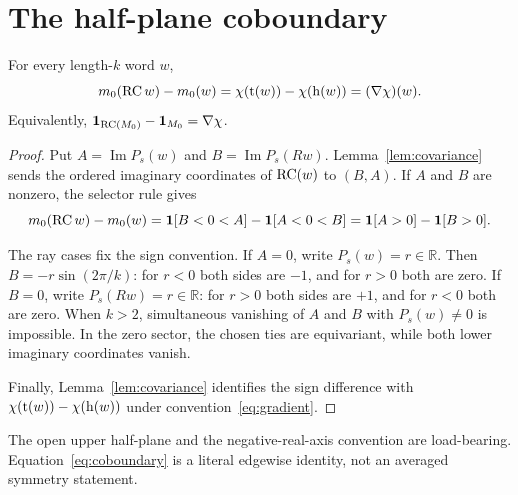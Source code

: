 \section{The half-plane coboundary}
\label{sec:coboundary}

\begin{theorem}
\label{thm:coboundary}
For every length-$k$ word $w$,
\begin{equation}
  m_0(\operatorname{RC} w)-m_0(w)
  =\chi(\operatorname{t}(w))-\chi(\operatorname{h}(w))
  =(\nabla\chi)(w).
  \label{eq:coboundary}
\end{equation}
Equivalently, $\mathbf 1_{\operatorname{RC}(M_0)}-\mathbf 1_{M_0}=\nabla\chi$.
\end{theorem}

\begin{proof}
Put
$A=\operatorname{Im}P_s(w)$ and
$B=\operatorname{Im}P_s(Rw)$.  Lemma~\ref{lem:covariance} sends the ordered
imaginary coordinates of $\operatorname{RC}(w)$ to $(B,A)$.  If $A$ and $B$ are nonzero,
the selector rule gives
\[
  m_0(\operatorname{RC} w)-m_0(w)
  =\mathbf 1[B<0<A]-\mathbf 1[A<0<B]
  =\mathbf 1[A>0]-\mathbf 1[B>0].
\]

The ray cases fix the sign convention.  If $A=0$, write
$P_s(w)=r\in\mathbb R$.  Then
$B=-r\sin(2\pi/k)$: for $r<0$ both sides are $-1$, and for $r>0$ both are
zero.  If $B=0$, write $P_s(Rw)=r\in\mathbb R$: for $r>0$ both sides are
$+1$, and for $r<0$ both are zero.  When $k>2$, simultaneous vanishing of
$A$ and $B$ with $P_s(w)\neq0$ is impossible.  In the zero sector, the
chosen ties are equivariant, while both lower imaginary coordinates vanish.

Finally, Lemma~\ref{lem:covariance} identifies the sign difference with
$\chi(\operatorname{t}(w))-\chi(\operatorname{h}(w))$ under convention~\eqref{eq:gradient}.
\end{proof}

The open upper half-plane and the negative-real-axis convention are
load-bearing.  Equation~\eqref{eq:coboundary} is a literal edgewise identity,
not an averaged symmetry statement.
